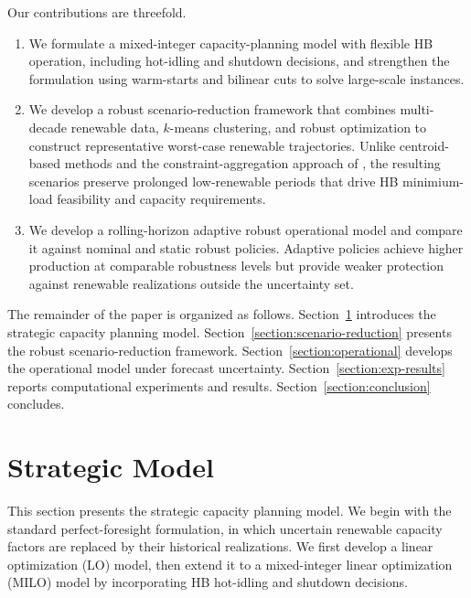 \documentclass[11pt, letter]{article}
\begin{document}
Our contributions are threefold.

\begin{enumerate}

\item We formulate a mixed-integer capacity-planning model with flexible HB operation, including hot-idling and shutdown decisions, and strengthen the formulation using warm-starts and bilinear cuts to solve large-scale instances.

\item We develop a robust scenario-reduction framework that combines multi-decade renewable data, $k$-means clustering, and robust optimization to construct representative worst-case renewable trajectories. Unlike centroid-based methods and the constraint-aggregation approach of \citet{bertsimas_decarbonizing_2023}, the resulting scenarios preserve prolonged low-renewable periods that drive HB  minimium-load feasibility and capacity requirements.

\item We develop a rolling-horizon adaptive robust operational model and compare it against nominal and static robust policies. Adaptive policies achieve higher production at comparable robustness levels but provide weaker protection against renewable realizations outside the uncertainty set.

\end{enumerate}

The remainder of the paper is organized as follows. Section~\ref{section:strategic} introduces the strategic capacity planning model. Section~\ref{section:scenario-reduction} presents the robust scenario-reduction framework. Section~\ref{section:operational} develops the operational model under forecast uncertainty. Section~\ref{section:exp-results} reports computational experiments and results. Section~\ref{section:conclusion} concludes.

\section{Strategic Model}\label{section:strategic}

This section presents the strategic capacity planning model. We begin with the standard perfect-foresight formulation, in which uncertain renewable capacity factors are replaced by their historical realizations. We first develop a linear optimization (LO) model, then extend it to a mixed-integer linear optimization (MILO) model by incorporating HB hot-idling and shutdown decisions.
\end{document}
